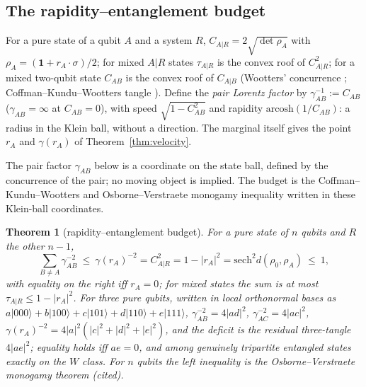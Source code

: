\documentclass[aps,pra,onecolumn,superscriptaddress,nofootinbib,10pt]{revtex4-2}
\newtheorem{theorem}{Theorem}
\theoremstyle{definition}
\theoremstyle{remark}
\begin{document}
\subsection{The rapidity--entanglement budget}\label{sec:bdbudget}
For a pure state of a qubit $A$ and a system $R$, $C_{A|R}=2\sqrt{\det\rho_A}$ with $\rho_A=(\mathbf1+r_A\cdot\sigma)/2$; for mixed $A|R$ states $\tau_{A|R}$ is the convex
roof of $C_{A|R}^2$; for a mixed two-qubit state $C_{AB}$ is the convex roof of $C_{A|B}$ (Wootters' concurrence
\cite{Wootters}; Coffman--Kundu--Wootters tangle \cite{n4:CKW}).  Define the \emph{pair Lorentz factor} by
$\gamma_{AB}^{-1}:=C_{AB}$ ($\gamma_{AB}=\infty$ at $C_{AB}=0$), with speed $\sqrt{1-C_{AB}^2}$ and rapidity $\mathrm{arcosh}(1/C_{AB})$: a radius in the Klein ball,
without a direction.  The marginal itself gives the point $r_A$ and $\gamma(r_A)$ of Theorem~\ref{thm:velocity}.

\noindent The pair factor $\gamma_{AB}$ below is a coordinate on the state ball, defined by the concurrence of the
pair; no moving object is implied.  The budget is the Coffman--Kundu--Wootters and Osborne--Verstraete monogamy
inequality \cite{n4:CKW,n4:OV} written in these Klein-ball coordinates.

\begin{theorem}[rapidity--entanglement budget]\label{thm:bdbudget}
For a pure state of $n$ qubits and $R$ the other $n-1$,
\begin{equation}\label{eq:bdbudget}
\sum_{B\ne A}\gamma_{AB}^{-2}\ \le\ \gamma(r_A)^{-2}=C_{A|R}^2=1-\lvert r_A\rvert^2=\mathrm{sech}^2d(\rho_0,\rho_A)\ \le\ 1 ,
\end{equation}
with equality on the right iff $r_A=0$; for mixed states the sum is at most $\tau_{A|R}\le1-\lvert r_A\rvert^2$.  For three pure qubits, written
in local orthonormal bases as $a\lvert000\rangle+b\lvert100\rangle+c\lvert101\rangle+d\lvert110\rangle+e\lvert111\rangle$, $\gamma_{AB}^{-2}=4\lvert ad\rvert^2$, $\gamma_{AC}^{-2}=4\lvert ac\rvert^2$, $\gamma(r_A)^{-2}=4\lvert a\rvert^2(\lvert c\rvert^2+\lvert d\rvert^2+\lvert e\rvert^2)$,
and the deficit is the residual three-tangle $4\lvert ae\rvert^2$; equality holds iff $ae=0$, and among genuinely tripartite
entangled states exactly on the $W$ class.  For $n$ qubits the left inequality is the Osborne--Verstraete
monogamy theorem \cite[Eq.~(1)]{n4:OV} (cited).
\end{theorem}
\end{document}
